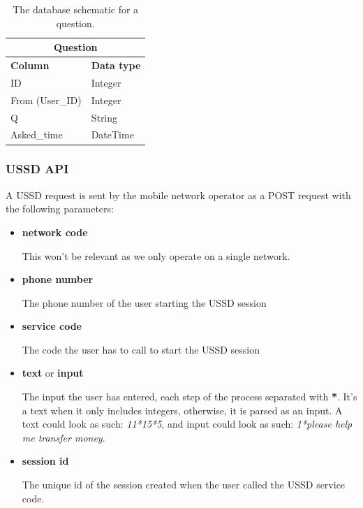\documentclass[11pt, a4paper]{article}
\begin{document}
\begin{table}[ht]
\centering
\begin{tabular}{ll}
\hline
\multicolumn{2}{|c|}{\textbf{Question}}                           \\ \hline
\multicolumn{1}{|l|}{\textbf{Column}}& \multicolumn{1}{l|}{\textbf{Data type}} \\ \hline
\multicolumn{1}{|l|}{ID}       & \multicolumn{1}{l|}{Integer} \\ \hline
\multicolumn{1}{|l|}{From (User\_ID)} & \multicolumn{1}{l|}{Integer} \\ \hline
\multicolumn{1}{|l|}{Q}   & \multicolumn{1}{l|}{String} \\ \hline
\multicolumn{1}{|l|}{Asked\_time}  & \multicolumn{1}{l|}{DateTime} \\ \hline
\end{tabular}
\caption{The database schematic for a question.}
\label{tab: question}
\end{table}

\subsubsection{USSD API}
A USSD request is sent by the mobile network operator as a POST request with the following parameters:
\begin{itemize}
  \item \textbf{network code}

  This won't be relevant as we only operate on a single network.

  \item \textbf{phone number}

  The phone number of the user starting the USSD session

  \item \textbf{service code}

  The code the user has to call to start the USSD session

  \item \textbf{text} or \textbf{input}

  The input the user has entered, each step of the process separated with \textbf{*}. It's a text when it only includes integers, otherwise, it is parsed as an input. A text could look as such: \textit{11*15*5}, and input could look as such: \textit{1*please help me transfer money}.

  \item \textbf{session id}

  The unique id of the session created when the user called the USSD service code.
\end{itemize}
\end{document}
